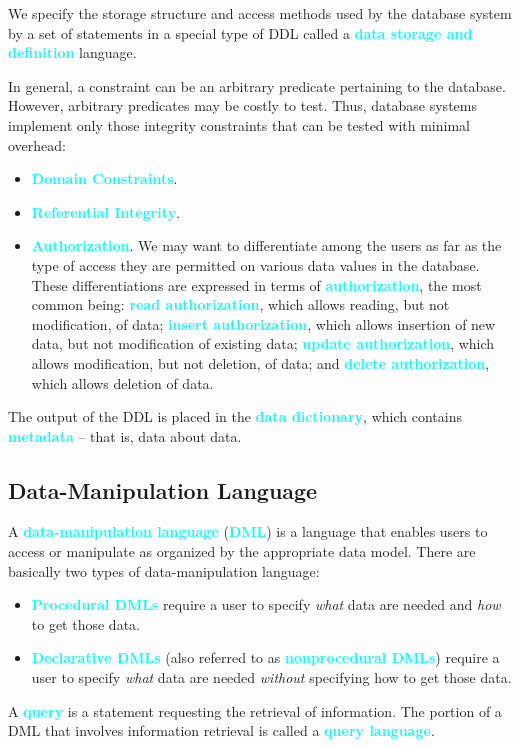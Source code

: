 \documentclass{Beautybook-EN}
\newcommand{\textcy}[1]{\textbf{\textcolor{cyan}{#1}}}
\begin{document}
We specify the storage structure and access methods used by the database system by a set of statements in a special type of DDL called a \textcy{data storage and definition} language.

In general, a constraint can be an arbitrary predicate pertaining to the database. However, arbitrary predicates may be costly to test. Thus, database systems implement only those integrity constraints that can be tested with minimal overhead:
\begin{itemize}
    \item\textcy{Domain Constraints}.
    \item\textcy{Referential Integrity}.
    \item\textcy{Authorization}. We may want to differentiate among the users as far as the type of access they are permitted on various data values in the database. These differentiations are expressed in terms of \textcy{authorization}, the most common being: \textcy{read authorization}, which allows reading, but not modification, of data; \textcy{insert authorization}, which allows insertion of new data, but not modification of existing data; \textcy{update authorization}, which allows modification, but not deletion, of data; and \textcy{delete authorization}, which allows deletion of data.
\end{itemize}

The output of the DDL is placed in the \textcy{data dictionary}, which contains \textcy{metadata} -- that is, data about data.

\subsection{Data-Manipulation Language}

A \textcy{data-manipulation language} (\textcy{DML}) is a language that enables users to access or manipulate as organized by the appropriate data model. There are basically two types of data-manipulation language:
\begin{itemize}
    \item\textcy{Procedural DMLs} require a user to specify \textit{what} data are needed and \textit{how} to get those data.
    \item\textcy{Declarative DMLs} (also referred to as \textcy{nonprocedural DMLs}) require a user to specify \textit{what} data are needed \textit{without} specifying how to get those data.
\end{itemize}

A \textcy{query} is a statement requesting the retrieval of information. The portion of a DML that involves information retrieval is called a \textcy{query language}.
\end{document}
